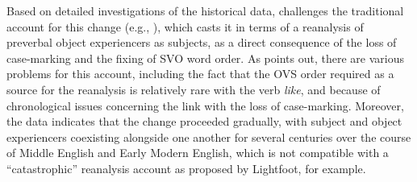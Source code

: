 \documentclass[output=paper,hidelinks]{langscibook}
\begin{document}
\noindent Based on detailed investigations of the historical data, \citet{allen1986} challenges the traditional account for this change (e.g., \citealp{jespersen1927modern,lightfoot1979principles,lightfoot1981history}), which casts it in terms of a reanalysis of preverbal object experiencers as subjects, as a direct consequence of the loss of case-marking and the fixing of SVO word order. As \citet{allen1986} points out, there are various problems for this account, including the fact that the OVS order required as a source for the reanalysis is relatively rare with the verb \textit{like}, and because of chronological issues concerning the link with the loss of case-marking. Moreover, the data indicates that the change proceeded gradually, with subject and object experiencers coexisting alongside one another for several centuries over the course of Middle English and Early Modern English, which is not compatible with a ``catastrophic'' reanalysis account as proposed by Lightfoot, for example. 

\end{document}
